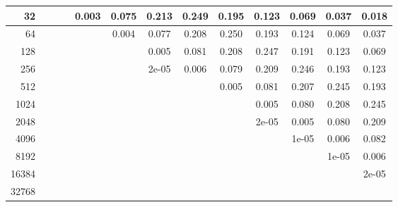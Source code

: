 \begin{appendices}
\begin{table}[H]
{\begin{tabular}{r|cccccccccccc}
32 &&&&0.003 &0.075 &0.213 &0.249 &0.195 &0.123 &0.069 &0.037 &0.018\\\hline

64 &&&&&0.004 &0.077 &0.208 &0.250 &0.193 &0.124 &0.069 &0.037\\\hline

128 &&&&&&0.005 &0.081 &0.208 &0.247 &0.191 &0.123 &0.069\\\hline

256 &&&&&&2e-05 &0.006 &0.079 &0.209 &0.246 &0.193 &0.123\\\hline

512 &&&&&&&&0.005 &0.081 &0.207 &0.245 &0.193\\\hline

1024 &&&&&&&&&0.005 &0.080 &0.208 &0.245\\\hline

2048 &&&&&&&&&2e-05 &0.005 &0.080 &0.209\\\hline

4096 &&&&&&&&&&1e-05 &0.006 &0.082\\\hline

8192 &&&&&&&&&&&1e-05 &0.006\\\hline

16384 &&&&&&&&&&&&2e-05\\\hline

32768 &&&&&&&&&&&&\\\hline

\end{tabular}
}

\end{table}
\begin{table}[H]
\ContinuedFloat
\caption[]{Experimentally computed CBT Estimate Distributon. Table 2/3}
\end{table}
\end{appendices}
